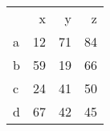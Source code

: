 \begin{tabular}{lrrr}
 & x & y & z \\
a & 12 & 71 & 84 \\
b & 59 & 19 & 66 \\
c & 24 & 41 & 50 \\
d & 67 & 42 & 45 \\
\end{tabular}
